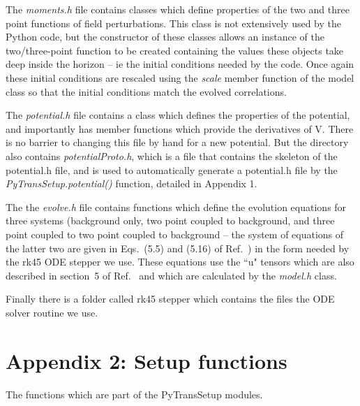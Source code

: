 \documentclass[10pt,
amsmath,amssymb,
aps,prd,nofootinbib,eqsecnum,a4paper]{revtex4}
\begin{document}
The {\it moments.h} file contains classes which define properties of the two and three point functions of field perturbations. 
This class is not extensively used by the Python code, but the constructor of these classes allows an instance of the 
two/three-point function to be created containing the values these objects take deep inside the horizon -- ie the initial 
conditions needed by the code. 
Once again these initial conditions are rescaled using the {\it scale} member function of the model class so that the initial 
conditions match the evolved 
correlations.

The {\it potential.h} file contains a class which defines the properties of the potential, and importantly has member functions which provide the derivatives of V. There is no barrier to changing this file by hand for a new potential. But the directory also contains {\it potentialProto.h}, which is a file that contains the skeleton of the potential.h file, and is used to automatically generate a potential.h file by the {\it PyTransSetup.potential()} function, detailed in Appendix 1.

The the {\it evolve.h} file contains functions which define the evolution equations for three systems (background only, two point 
coupled to background, and three point coupled to two point coupled to background -- the system of equations of the latter two are given 
in Eqs.~(5.5) and (5.16) of Ref.~\cite{xxx}) in the form needed 
by the rk45 ODE stepper we use. These equations use the ``u" tensors which are also described in 
section~5 of Ref.~\cite{xxx} and 
which are calculated by the {\it model.h} class.  

Finally there is a folder called rk45 stepper
which contains the files the ODE solver routine we use.


\section*{Appendix 2: Setup functions}

The functions which are part of the { PyTransSetup} modules.
\end{document}

